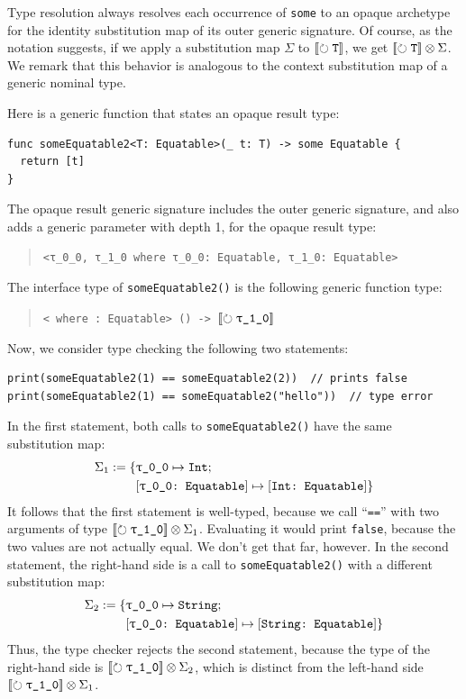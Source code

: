 \documentclass[../generics]{subfiles}
\begin{document}
Type resolution always resolves each occurrence of \texttt{some} to an opaque archetype for the identity substitution map of its outer generic signature. Of course, as the notation suggests, if we apply a substitution map $\Sigma$ to $[\![\circlearrowright \texttt{\texttt{T}}]\!]$, we get $[\![\circlearrowright \texttt{\texttt{T}}]\!] \otimes \Sigma$. We remark that this behavior is analogous to the context substitution map of a generic nominal type.

\begin{example}\label{generic opaque example}
Here is a generic function that states an opaque result type:
\begin{Verbatim}
func someEquatable2<T: Equatable>(_ t: T) -> some Equatable {
  return [t]
}
\end{Verbatim}
The opaque result generic signature includes the outer generic signature, and also adds a generic parameter with depth 1, for the opaque result type:
\begin{quote}
\begin{verbatim}
<τ_0_0, τ_1_0 where τ_0_0: Equatable, τ_1_0: Equatable>
\end{verbatim}
\end{quote}
The interface type of \texttt{someEquatable2()} is the following generic function type:
\begin{quote}
\texttt{<\rT\ where \rT:\ Equatable> (\rT) -> $\Oy$}
\end{quote}
Now, we consider type checking the following two statements:
\begin{Verbatim}
print(someEquatable2(1) == someEquatable2(2))  // prints false
print(someEquatable2(1) == someEquatable2("hello"))  // type error
\end{Verbatim}
In the first statement, both calls to \texttt{someEquatable2()} have the same substitution map:
\begin{align*}
\Sigma_1 := \SubstMapC{
&\SubstType{\rT}{Int}
}{\\
&\SubstConf{\rT}{Int}{Equatable}
}
\end{align*}
It follows that the first statement is well-typed, because we call ``\texttt{==}'' with two arguments of type $\Oy \otimes \Sigma_1$. Evaluating it would print \texttt{false}, because the two values are not actually equal. We don't get that far, however. In the second statement, the right-hand side is a call to \texttt{someEquatable2()} with a different substitution map:
\begin{align*}
\Sigma_2 := \SubstMapC{
&\SubstType{\rT}{String}
}{\\
&\SubstConf{\rT}{String}{Equatable}
}
\end{align*}
Thus, the type checker rejects the second statement, because the type of the right-hand side is $\Oy \otimes \Sigma_2$, which is distinct from the left-hand side $\Oy \otimes \Sigma_1$.


\end{example}
\end{document}
